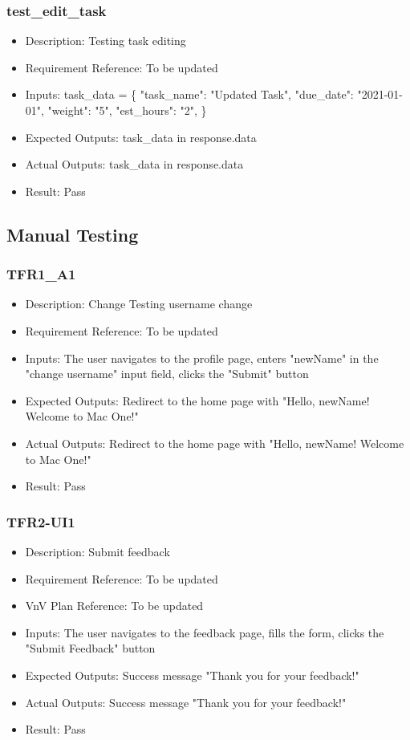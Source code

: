\documentclass[12pt, titlepage]{article}
\begin{document}
\subsubsection{test\_edit\_task}\label{3.1.17}
\begin{itemize}
    \item Description: Testing task editing 
    \item Requirement Reference: To be updated
    \item Inputs:  task\_data = \{
        "task\_name": "Updated Task",
        "due\_date": "2021-01-01",
        "weight": "5",
        "est\_hours": "2",
    \}
    \item Expected Outputs: task\_data in response.data
    \item Actual Outputs: task\_data in response.data
    \item Result: Pass
\end{itemize}


\subsection{Manual Testing}
\subsubsection{TFR1\_A1}\label{3.2.1}
\begin{itemize}
    \item Description: Change Testing username change
    \item Requirement Reference: To be updated
    \item Inputs: The user navigates to the profile page, enters "newName" in the "change username" input field, clicks the "Submit" button
    \item Expected Outputs: Redirect to the home page with "Hello, newName! Welcome to Mac One!"
    \item Actual Outputs: Redirect to the home page with "Hello, newName! Welcome to Mac One!"
    \item Result: Pass
\end{itemize}

\subsubsection{TFR2-UI1}\label{3.2.2}
\begin{itemize}
    \item Description: Submit feedback
    \item Requirement Reference: To be updated
    \item VnV Plan Reference: To be updated
    \item Inputs: The user navigates to the feedback page, fills the form, clicks the "Submit Feedback" button
    \item Expected Outputs: Success message "Thank you for your feedback!"
    \item Actual Outputs: Success message "Thank you for your feedback!"
    \item Result: Pass
\end{itemize}
\end{document}
